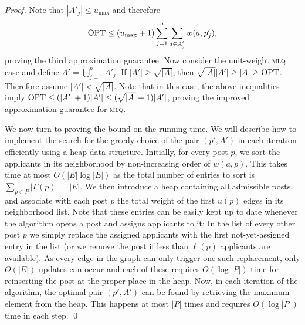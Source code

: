 \documentclass{llncs}
\newcommand{\OPT}{\textup{OPT}}
\begin{document}
\begin{proof}
Note that $|A'_j| \leq u_{\max}$ and therefore \[\OPT \leq (u_{\max} + 1) \sum_{j = 1}^{n} \sum_{a \in A'_j} w(a, p'_j),\] proving the third approximation guarantee. Now consider the unit-weight \textsc{mlq} case and define $A' = \bigcup_{j = 1}^{n} A'_j$. If $|A'| \geq \sqrt{|A|}$, then $\sqrt{|A|}|A'| \geq |A| \geq \OPT$. Therefore assume $|A'| < \sqrt{|A|}$.
Note that in this case, the above inequalities imply $\OPT \leq (|A'| + 1)|A'| \leq (\sqrt{|A|} + 1)|A'|$, proving the improved approximation guarantee for \textsc{mlq}.

We now turn to proving the bound on the running time. We will describe how to implement the search for the greedy choice of the pair $(p', A')$ in each iteration efficiently using a heap data structure. Initially, for every post $p$, we sort the applicants in its neighborhood by non-increasing order of $w(a, p)$. This takes time at most $O(|E| \log |E|)$ as the total number of entries to sort is $\sum_{p \in P} |\Gamma(p)| = |E|$. We then introduce a heap containing all admissible posts, and associate with each post $p$ the total weight of the first $u(p)$ edges in its neighborhood list. 
Note that these entries can be easily kept up to date whenever the algorithm opens a post and assigns applicants to it: In the list of every other post $p$ we simply replace the assigned applicants with the first not-yet-assigned entry in the list (or we remove the post if less than $\ell(p)$ applicants are available). As every edge in the graph can only trigger one such replacement, only $O(|E|)$ updates can occur and each of these requires $O(\log |P|)$ time for reinserting the post at the proper place in the heap. Now, in each iteration of the algorithm, the optimal pair $(p', A')$ can be found by retrieving the maximum element from the heap. This happens at most $|P|$ times and requires $O(\log |P|)$ time in each step. \qed
\end{proof}
\end{document}
